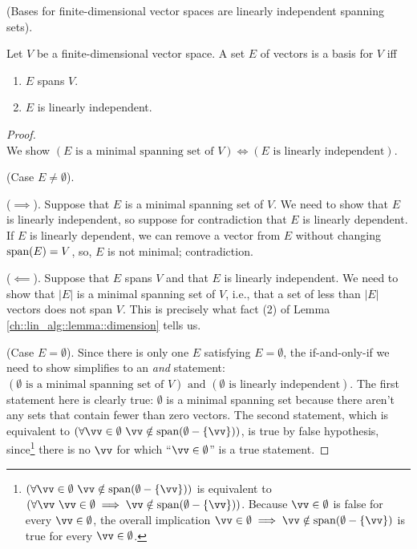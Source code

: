 \begin{theorem}
    (Bases for finite-dimensional vector spaces are linearly independent spanning sets).
    
    Let $V$ be a finite-dimensional vector space. A set $E$ of vectors is a basis for $V$ iff
    
    \begin{enumerate}
        \item $E$ spans $V$.
        \item $E$ is linearly independent.
    \end{enumerate}
\end{theorem}

\begin{proof}
    \mbox{} \\ \indent
    We show $(\text{$E$ is a minimal spanning set of $V$}) \iff (\text{$E$ is linearly independent})$.
    
    (Case $E \neq \emptyset$).
    
    \indent ($\implies$). Suppose that $E$ is a minimal spanning set of $V$. We need to show that $E$ is linearly independent, so suppose for contradiction that $E$ is linearly dependent. If $E$ is linearly dependent, we can remove a vector from $E$ without changing $\text{span}(E) = V$, so, $E$ is not minimal; contradiction.
    
    \indent ($\impliedby$). Suppose that $E$ spans $V$ and that $E$ is linearly independent. We need to show that $|E|$ is a minimal spanning set of $V$, i.e., that a set of less than $|E|$ vectors does not span $V$. This is precisely what fact (2) of Lemma \ref{ch::lin_alg::lemma::dimension} tells us.
    
    (Case $E = \emptyset$). Since there is only one $E$ satisfying $E = \emptyset$, the if-and-only-if we need to show simplifies to an \textit{and} statement: $(\text{$\emptyset$ is a minimal spanning set of $V$}) \text{ and } (\text{$\emptyset$ is linearly independent})$. The first statement here is clearly true: $\emptyset$ is a minimal spanning set because there aren't any sets that contain fewer than zero vectors. The second statement, which is equivalent to $(\forall \vv \in \emptyset \spc \vv \notin \spann(\emptyset - \{\vv\}))$, is true by false hypothesis, since\footnote{$(\forall \vv \in \emptyset \spc \vv \notin \spann(\emptyset - \{\vv\}))$ is equivalent to $(\forall \vv \spc \vv \in \emptyset \implies \vv \notin \spann(\emptyset - \{\vv\}))$. Because $\vv \in \emptyset$ is false for every $\vv \in \emptyset$, the overall implication $\vv \in \emptyset \implies \vv \notin \spann(\emptyset - \{\vv\})$ is true for every $\vv \in \emptyset$.} there is no $\vv$ for which ``$\vv \in \emptyset$'' is a true statement.
    
    
\end{proof}

